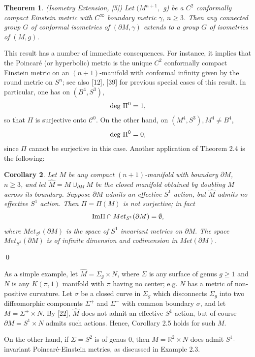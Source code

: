 \documentclass[11pt,amsfonts]{amsart}
\newtheorem{theorem}{Theorem}[section]
\newtheorem{corollary}[theorem]{Corollary}
\def\endproof{\qed \medskip}
\begin{document}
\begin{theorem} \label{t 2.4.} {\rm (Isometry Extension, [5])}
  Let $(M^{n+1},$ g) be a $C^{2}$ conformally compact Einstein metric 
with $C^{\infty}$ boundary metric $\gamma$, $n \geq 3$. Then any 
connected group $G$ of conformal isometries of $(\partial M, \gamma)$ 
extends to a group $G$ of isometries of $(M, g)$. 
\end{theorem}

 This result has a number of immediate consequences. For instance, it 
implies that the Poincar\'e (or hyperbolic) metric is the unique $C^{2}$ 
conformally compact Einstein metric on an $(n+1)$-manifold with conformal 
infinity given by the round metric on $S^{n}$; see also [12], [39] for previous 
special cases of this result. In particular, one has on $(B^{4}, S^{3})$, 
$${\rm deg} \ \Pi^{0} = 1, $$
so that $\Pi$ is surjective onto ${\mathcal C}^{0}$. On the other hand, on 
$(M^{4}, S^{3}), M^{4} \neq  B^{4}$, 
$${\rm deg} \ \Pi^{0} = 0, $$
since $\Pi$ cannot be surjective in this case. Another application of 
Theorem 2.4 is the following:

\begin{corollary} \label{c 2.5.}
  Let $M$ be any compact $(n+1)$-manifold with boundary $\partial M$, 
$n \geq 3$, and let $\hat M = M\cup_{\partial M}M$ be the closed manifold 
obtained by doubling $M$ across its boundary. Suppose $\partial M$ admits 
an effective $S^{1}$ action, but $\hat M$ admits no effective 
$S^{1}$ action. Then $\Pi = \Pi(M)$ is not surjective; in fact 
$${\rm Im} \Pi \cap  Met_{S^{1}}(\partial M) = \emptyset  , $$
where $Met_{S^{1}}(\partial M)$ is the space of $S^{1}$ invariant 
metrics on $\partial M.$ The space $Met_{S^{1}}(\partial M)$ is of 
infinite dimension and codimension in $Met(\partial M)$. 
\end{corollary}
{\endproof}

 As a simple example, let $\hat M = \Sigma_{g}\times N$, where $\Sigma$ 
is any surface of genus $g \geq 1$ and $N$ is any $K(\pi ,1)$ 
manifold with $\pi$ having no center; e.g. $N$ has a metric of 
non-positive curvature. Let $\sigma$ be a closed curve in $\Sigma_{g}$ 
which disconnects $\Sigma_{g}$ into two diffeomorphic components 
$\Sigma^{+}$ and $\Sigma^{-}$ with common boundary $\sigma$, and let 
$M = \Sigma^{+}\times N$. By [22], $\hat M$ does not admit an effective 
$S^{1}$ action, but of course $\partial M = S^{1}\times N$ admits such 
actions. Hence, Corollary 2.5 holds for such $M$. 

  On the other hand, if $\Sigma = S^{2}$ is of genus 0, then $M = 
{\mathbb R}^{2}\times N$ does admit $S^{1}$-invariant Poincar\'e-Einstein 
metrics, as discussed in Example 2.3. 
\end{document}
